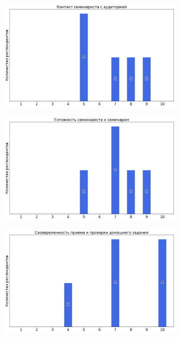         \begin{figure}[H]
            \centering
            \begin{subfigure}[b]{0.45\textwidth}
                \centering
                \includegraphics[width=\textwidth]{images/4 course/Введение в распараллеливание алгоритмов и программ/seminarists-marks-Пальян Р.Л.-0.png}
            \end{subfigure}
            \begin{subfigure}[b]{0.45\textwidth}
                \centering
                \includegraphics[width=\textwidth]{images/4 course/Введение в распараллеливание алгоритмов и программ/seminarists-marks-Пальян Р.Л.-1.png}
            \end{subfigure}
            \begin{subfigure}[b]{0.45\textwidth}
                \centering
                \includegraphics[width=\textwidth]{images/4 course/Введение в распараллеливание алгоритмов и программ/seminarists-marks-Пальян Р.Л.-2.png}

\end{subfigure}
\end{figure}
